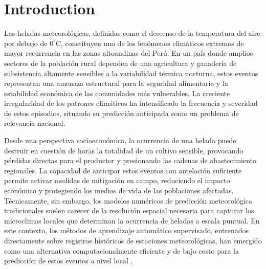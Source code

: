 \section{Introduction}

Las heladas meteorológicas, definidas como el descenso de la
temperatura del aire por debajo de $0^{\circ}\text{C}$, constituyen uno de los
fenómenos climáticos extremos de mayor recurrencia en las zonas altoandinas del
Perú. En un país donde amplios sectores de la población rural dependen de una
agricultura y ganadería de subsistencia altamente sensibles a la variabilidad
térmica nocturna, estos eventos representan una amenaza estructural para la
seguridad alimentaria y la estabilidad económica de las comunidades más
vulnerables. La creciente irregularidad de los patrones climáticos ha
intensificado la frecuencia y severidad de estos episodios, situando su
predicción anticipada como un problema de relevancia nacional.

Desde una perspectiva socioeconómica, la ocurrencia de una helada puede destruir
en cuestión de horas la totalidad de un cultivo sensible, provocando pérdidas
directas para el productor y presionando las cadenas de abastecimiento
regionales. La capacidad de anticipar estos eventos con antelación suficiente
permite activar medidas de mitigación en campo, reduciendo el impacto económico
y protegiendo los medios de vida de las poblaciones afectadas. Técnicamente, sin
embargo, los modelos numéricos de predicción meteorológica tradicionales suelen
carecer de la resolución espacial necesaria para capturar los microclimas
locales que determinan la ocurrencia de heladas a escala puntual. En este
contexto, los métodos de aprendizaje automático supervisado, entrenados
directamente sobre registros históricos de estaciones meteorológicas, han
emergido como una alternativa computacionalmente eficiente y de bajo costo para
la predicción de estos eventos a nivel local
\cite{diedrichs2018,talsma2023,rozante2023,perez2025}.

